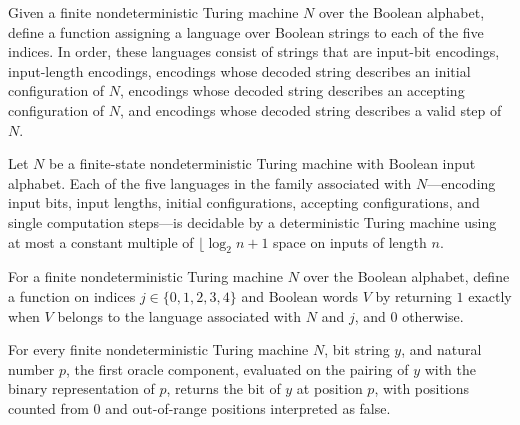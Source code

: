 \begin{definition}
\label{Complexity.PathHard.As}
\leanok
{}
Given a finite nondeterministic Turing machine $N$ over the Boolean alphabet, define a
function assigning a language over Boolean strings to each of the five indices. In
order, these languages consist of strings that are input-bit encodings, input-length
encodings, encodings whose decoded string describes an initial configuration of $N$,
encodings whose decoded string describes an accepting configuration of $N$, and
encodings whose decoded string describes a valid step of $N$.
\end{definition}

\begin{lemma}
\label{Complexity.PathHard.As_mem}
\leanok
{}
Let $N$ be a finite-state nondeterministic Turing machine with Boolean input alphabet.
Each of the five languages in the family associated with $N$—encoding input bits, input
lengths, initial configurations, accepting configurations, and single computation
steps—is decidable by a deterministic Turing machine using at most a constant multiple
of $\lfloor{\log_2 n}+1$ space on inputs of length $n$.
\end{lemma}

\begin{definition}
\label{Complexity.PathHard.orc}
\leanok
{}
For a finite nondeterministic Turing machine $N$ over the Boolean alphabet, define a
function on indices $j\in\{0,1,2,3,4\}$ and Boolean words $V$ by returning $1$ exactly
when $V$ belongs to the language associated with $N$ and $j$, and $0$ otherwise.
\end{definition}

\begin{lemma}
\label{Complexity.PathHard.orc_bit}
\leanok
{}
For every finite nondeterministic Turing machine $N$, bit string $y$, and natural number
$p$, the first oracle component, evaluated on the pairing of $y$ with the binary
representation of $p$, returns the bit of $y$ at position $p$, with positions counted
from $0$ and out-of-range positions interpreted as false.
\end{lemma}

